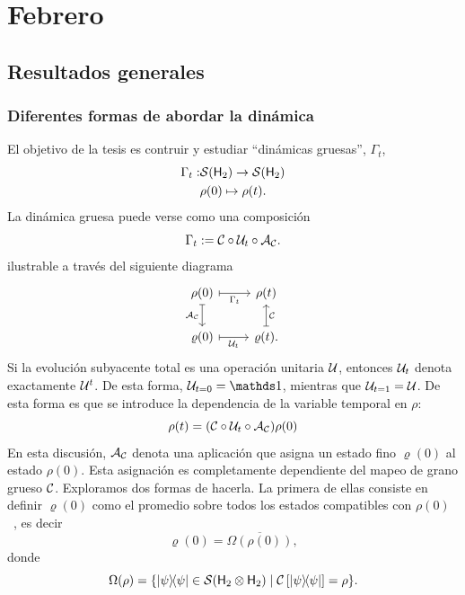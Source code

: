 \chapter{Febrero}

\section{Resultados generales}

\subsection{Diferentes formas de abordar la dinámica}
El objetivo de la tesis es contruir y estudiar ``dinámicas gruesas'', $\Gamma_t$,
\begin{align*}
\Gamma_{t}:&\mathcal{S}({\sf H}_2)\rightarrow \mathcal{S}({\sf H}_2)\\
&\rho(0) \mapsto \rho(t).
\end{align*}
La dinámica gruesa puede verse como una composición
\begin{equation*}
\Gamma_t:=\mathcal{C} \circ \mathcal{U}_t \circ \mathcal{A}_{\mathcal{C}}.
\end{equation*}
ilustrable a través del siguiente diagrama
\[\begin{tikzcd}[arrows={<-|}]
\rho(0)  & \rho(t) \arrow{l}{\Gamma_{t}} \arrow{d}{\mcC}\\
\varrho(0) \arrow{u}{\mcA_{\mcC}} & \varrho(t). \arrow{l}{\mcU_{t}}
\end{tikzcd}
\]
Si la evolución subyacente total es una operación unitaria $\mathcal{U}$, entonces $\mathcal{U}_{t}$  denota exactamente $\mathcal{U}^{t}$. De esta forma, $\mcU_{t=0}=\Id$, mientras que  $\mathcal{U}_{t=1}=\mathcal{U}$. De esta forma es que se introduce la dependencia de la variable temporal en $\rho$:
\begin{equation*}
\rho(t)=(\mathcal{C} \circ \mathcal{U}_t \circ \mathcal{A}_{\mathcal{C}})\rho(0)
\end{equation*}
En esta discusión, $\mathcal{A}_{\mathcal{C}}$ denota una aplicación que asigna un estado fino $\varrho(0)$ al estado $\rho(0)$. Esta asignación es completamente dependiente del mapeo de grano grueso $\mathcal{C}$. Exploramos dos formas de hacerla. La primera de ellas consiste en definir $\varrho(0)$ como el promedio sobre todos los estados compatibles con $\rho(0)$~\cite{Macro-To-Micro}, es decir
$$\varrho(0)=\overline{\Omega(\rho(0))},$$
donde
\begin{equation*}
\Omega(\rho)=\{\dyad{\psi}\in \mcS(\hilbert_2 \otimes \hilbert_2) \mid \mcC\left[\dyad{\psi}\right]=\rho\}.
\end{equation*}

